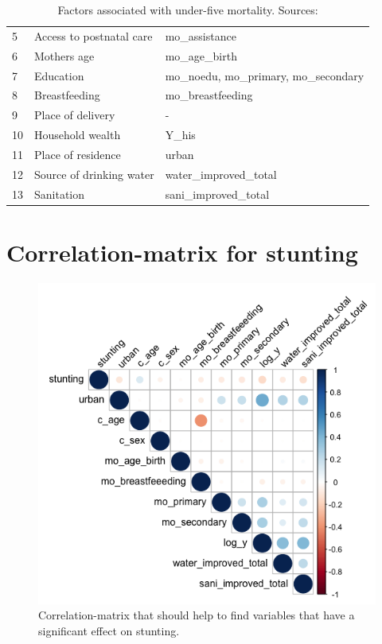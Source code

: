 \documentclass[a4paper, 11pt]{article} %
\begin{document}
\begin{appendices}
\begin{table}[h!]
\begin{tabular}{@{}lll@{}}
5 & Access to postnatal care & mo\_assistance \\
6 & Mothers age & mo\_age\_birth \\
7 & Education & mo\_noedu, mo\_primary, mo\_secondary \\
8 & Breastfeeding & mo\_breastfeeding \\
9 & Place of delivery & - \\ \midrule

10 & Household wealth & Y\_his \\
11 & Place of residence  & urban \\ 
12 & Source of drinking water & water\_improved\_total  \\
13 & Sanitation &  sani\_improved\_total  \\ \bottomrule
\end{tabular}
    \caption{Factors associated with under-five mortality. Sources: \cite{Ettarh2012Mar}\cite{Who2020Sep}} \cite{UNICEF2006}
    \label{table:dead5}
\end{table}


\newpage
\section{Correlation-matrix for stunting} \label{sec:appendixc}
\begin{figure}[h!]
    \centering
    \includegraphics[scale=0.6]{figures/corrmatrix_stunting} 
    \caption{Correlation-matrix that should help to find variables that have a significant effect on stunting.}
    \label{fig:corrmatrix_stunting}
\end{figure}



\end{appendices}
\end{document}
